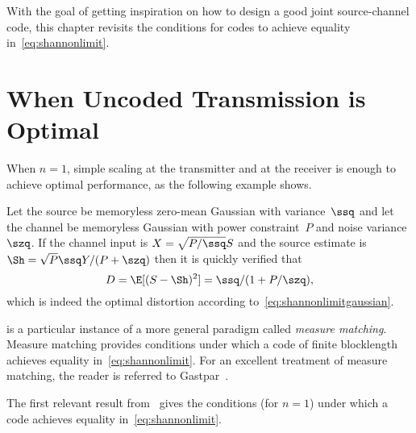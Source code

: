 With the goal of getting inspiration on how to design a good joint
source-channel code, this chapter revisits the conditions for codes to achieve
equality in~\eqref{eq:shannonlimit}.


\section{When Uncoded Transmission is Optimal}\label{sec:bwmatch}

When $n=1$, simple scaling at the transmitter and at the receiver is enough to
achieve optimal performance, as the following example shows.

\begin{example}
  \label{ex:gausssingle}
  Let the source be memoryless zero-mean Gaussian with variance~$\ssq$ and let
  the channel be memoryless Gaussian with power constraint~$P$ and noise
  variance~$\szq$. If the channel input is $X = \sqrt{P/\ssq} S$ and the source
  estimate is $\Sh = \sqrt{P} \ssq Y / (P + \szq)$ then it is quickly verified
  that 
  \begin{equation*}
    D = \E[(S - \Sh)^2] = \ssq / (1 + P/\szq),
  \end{equation*}
  which is indeed the optimal distortion according
  to~\eqref{eq:shannonlimitgaussian}.
\end{example}

 is a particular instance of a more general paradigm called
\emph{measure matching}. Measure matching provides conditions under which a code
of finite blocklength achieves equality in~\eqref{eq:shannonlimit}.
For an excellent treatment of measure matching, the reader is referred to
Gastpar~\cite{GastparRV2003,GastparThesis}.

The first relevant result from~\cite{GastparRV2003} gives the conditions (for
$n=1$) under which a code achieves equality in~\eqref{eq:shannonlimit}.

